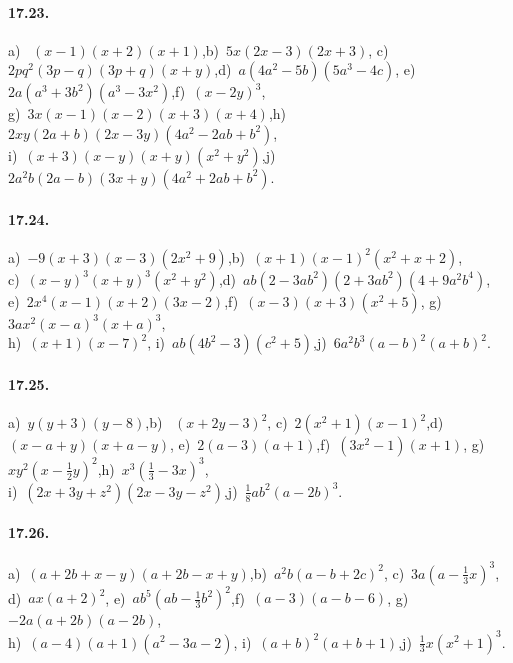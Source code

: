 \paragraph{17.23.} a)~ $(x-1)(x+2)(x+1)$,\quad b)~$5x(2x-3)(2x+3)$,\quad
c)~$2{pq}^{2}(3p-q)(3p+q)(x+y)$,\quad d)~$a(4a^{2}-5b)(5a^{3}-4c)$,\quad
e)~$2a(a^{3}+3b^{2})(a^{3}-3x^{2})$,\quad f)~$(x-2y)^{3}$,\quad \protect\\
g)~$3x(x-1)(x-2)(x+3)(x+4)$,\quad h)~$2xy(2a+b)(2x-3y)(4a^{2}-2{ab}+b^{2})$,\quad \protect\\
i)~$(x+3)(x-y)(x+y)(x^{2}+y^{2})$,\quad j)~$2a^{2}b(2a-b)(3x+y)(4a^{2}+2{ab}+b^{2})$.

\paragraph{17.24.} a)~$-9(x+3)(x-3)(2x^{2}+9)$,\quad b)~$(x+1)(x-1)^{2}(x^{2}+x+2)$,\quad \protect\\
c)~$(x-y)^{3}(x+y)^{3}(x^{2}+y^{2})$,\quad d)~${ab}(2-3{ab}^{2})(2+3{ab}^{2})(4+9a^{2}b^{4})$,\quad \protect\\
e)~$2x^{4}(x-1)(x+2)(3x-2)$,\quad f)~$(x-3)(x+3)(x^{2}+5)$,\quad
g)~$3ax^{2}(x-a)^{3}(x+a)^{3}$,\protect\\
h)~$(x+1)(x-7)^{2}$,\quad
i)~${ab}(4b^{2}-3)(c^{2}+5)$,\quad j)~$6a^{2}b^{3}(a-b)^{2}(a+b)^{2}$.

\paragraph{17.25.} a)~$y(y+3)(y-8)$,\quad b)~ $(x+2y-3)^{2}$,\quad
c)~$2(x^{2}+1)(x-1)^{2}$,\quad d)~$(x-a+y)(x+a-y)$,\quad
e)~$2(a-3)(a+1)$,\quad f)~$(3x^{2}-1)(x+1)$,\quad
g)~$xy^{2}(x-\frac{1}{2}y)^{2}$,\quad h)~$x^{3}\left(\frac{1}{3}-3x\right)^{3}$,\protect\\
i)~$(2x+3y+z^{2})(2x-3y-z^{2})$,\quad j)~$\frac{1}{8}{ab}^{2}(a-2b)^{3}$.

\paragraph{17.26.} a)~$(a+2b+x-y)(a+2b-x+y)$,\quad b)~$a^{2}b(a-b+2c)^{2}$,\quad
c)~$3a\left(a-\frac{1}{3}x\right)^{3}$,\protect\\
d)~$ax(a+2)^{2}$,\quad
e)~${ab}^{5}\left({ab}-\frac{1}{3}b^{2}\right)^{2}$,\quad f)~$(a-3)(a-b-6)$,\quad
g)~$-2a(a+2b)(a-2b)$,\protect\\
h)~$(a-4)(a+1)(a^{2}-3a-2)$,\quad
i)~$(a+b)^{2}(a+b+1)$,\quad j)~$\frac{1}{3}x(x^{2}+1)^{3}$.

